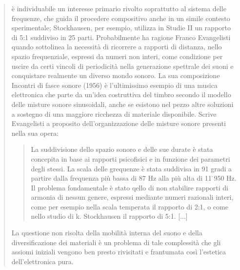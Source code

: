 \begin{quote}
	è individuabile un interesse primario rivolto soprattutto al sistema delle frequenze, che guida il procedere compositivo anche in un simile contesto sperimentale; Stockhausen, per esempio, utilizza in Studie II un rapporto di 5:1 suddiviso in 25 parti. Probabilmente ha ragione Franco Evangelisti quando sottolinea la necessità di ricorrere a rapporti di distanza, nello spazio frequenziale, espressi da numeri non interi, come condizione per uscire da certi vincoli di periodicità nella generazione spettrale dei suoni e conquistare realmente un diverso mondo sonoro. La sua composizione Incontri di fasce sonore (1956) è l’ultimissimo esempio di una musica elettronica che parte da un’idea costruttiva del timbro secondo il modello delle misture sonore sinusoidali, anche se esistono nel pezzo altre soluzioni a sostegno di una maggiore ricchezza di materiale disponibile. Scrive Evangelisti a proposito dell’organizzazione delle misture sonore presenti nella sua opera:

	\begin{quote}
		La suddivisione dello spazio sonoro e delle sue durate è stata concepita in base ai rapporti psicofisici e in funzione dei parametri degli stessi. La scala delle grequenze è stata suddivisa in 91 gradi a partire dalla frequenza più bassa di 87 Hz alla più alta di 11 ̇950 Hz. Il problema fondamentale è stato qello di non stabilire rapporti di armonia di nessun genere, espressi mediante numeri razionali interi, come per esempio nella scala temperata il rapporto di 2:1, o come nello studio di k. Stockhausen il rapporto di 5:1. [...]
	\end{quote}

La questione non risolta della mobilità interna del suono e della diversificazione dei materiali è un problema di tale complessità che gli assiomi iniziali vengono ben presto rivisitati e frantumata così l’estetica dell’elettronica pura.

\end{quote}
